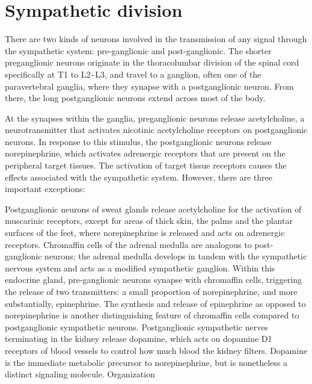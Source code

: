 \hypertarget{sympathetic-division}{%
\section{Sympathetic division}\label{sympathetic-division}}

There are two kinds of neurons involved in the transmission of any signal through the sympathetic system: pre-ganglionic and post-ganglionic. The shorter preganglionic neurons originate in the thoracolumbar division of the spinal cord specifically at T1 to L2\textasciitilde{}L3, and travel to a ganglion, often one of the paravertebral ganglia, where they synapse with a postganglionic neuron. From there, the long postganglionic neurons extend across most of the body.

At the synapses within the ganglia, preganglionic neurons release acetylcholine, a neurotransmitter that activates nicotinic acetylcholine receptors on postganglionic neurons. In response to this stimulus, the postganglionic neurons release norepinephrine, which activates adrenergic receptors that are present on the peripheral target tissues. The activation of target tissue receptors causes the effects associated with the sympathetic system. However, there are three important exceptions:

Postganglionic neurons of sweat glands release acetylcholine for the activation of muscarinic receptors, except for areas of thick skin, the palms and the plantar surfaces of the feet, where norepinephrine is released and acts on adrenergic receptors.
Chromaffin cells of the adrenal medulla are analogous to post-ganglionic neurons; the adrenal medulla develops in tandem with the sympathetic nervous system and acts as a modified sympathetic ganglion. Within this endocrine gland, pre-ganglionic neurons synapse with chromaffin cells, triggering the release of two transmitters: a small proportion of norepinephrine, and more substantially, epinephrine. The synthesis and release of epinephrine as opposed to norepinephrine is another distinguishing feature of chromaffin cells compared to postganglionic sympathetic neurons.
Postganglionic sympathetic nerves terminating in the kidney release dopamine, which acts on dopamine D1 receptors of blood vessels to control how much blood the kidney filters. Dopamine is the immediate metabolic precursor to norepinephrine, but is nonetheless a distinct signaling molecule.
Organization

